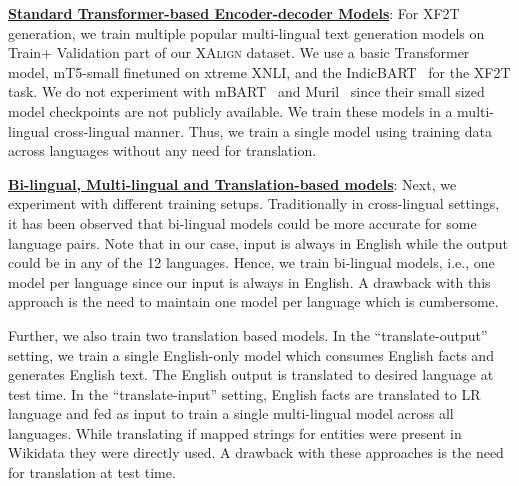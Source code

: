\documentclass[runningheads]{llncs}
\begin{document}
\noindent\underline{\textbf{Standard Transformer-based Encoder-decoder Models}}: For XF2T generation, we train multiple popular multi-lingual text generation models on Train+ Validation part of our \textsc{XAlign} dataset. We use a basic Transformer model, mT5-small finetuned on xtreme XNLI, and the IndicBART~\cite{dabre2021indicbart} for the XF2T task. We do not experiment with mBART~\cite{maurya2021zmbart} and Muril~\cite{khanuja2021muril} since their small sized model checkpoints are not publicly available. We train these models in a multi-lingual cross-lingual manner. Thus, we train a single model using training data across languages without any need for translation. 

\noindent\underline{\textbf{Bi-lingual, Multi-lingual and Translation-based models}}: Next, we experiment with different training setups. Traditionally in cross-lingual settings, it has been observed that bi-lingual models could be more accurate for some language pairs. Note that in our case, input is always in English while the output could be in any of the 12 languages. Hence, we train bi-lingual models, i.e., one model per language since our input is always in English. A drawback with this approach is the need to maintain one model per language which is cumbersome.

Further, we also train two translation based models. In the ``translate-output'' setting, we train a single English-only model which consumes English facts and generates English text. The English output is translated to desired language at test time. In the ``translate-input'' setting, English facts are translated to LR language and fed as input to train a single multi-lingual model across all languages. While translating if mapped strings for entities were present in Wikidata they were directly used. A drawback with these approaches is the need for translation at test time.
\end{document}
